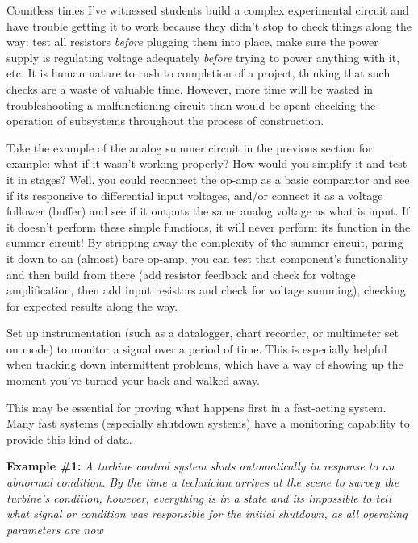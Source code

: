 Countless times I've witnessed students build a complex experimental
circuit and have trouble getting it to work because they didn't stop to
check things along the way: test all resistors {\em before} plugging
them into place, make sure the power supply is regulating voltage
adequately {\em before} trying to power anything with it, etc. It is
human nature to rush to completion of a project, thinking that such
checks are a waste of valuable time. However, more time will be wasted
in troubleshooting a malfunctioning circuit than would be spent checking
the operation of subsystems throughout the process of construction.

Take the example of the analog summer circuit in the previous section
for example: what if it wasn't working properly? How would you simplify
it and test it in stages? Well, you could reconnect the op-amp as a
basic comparator and see if its responsive to differential input
voltages, and/or connect it as a voltage follower (buffer) and see if it
outputs the same analog voltage as what is input. If it doesn't perform
these simple functions, it will never perform its function in the summer
circuit! By stripping away the complexity of the summer circuit, paring
it down to an (almost) bare op-amp, you can test that component's
functionality and then build from there (add resistor feedback and check
for voltage amplification, then add input resistors and check for
voltage summing), checking for expected results along the way.

\stopsubsection

\startsubsection[title={Trap a Signal},reference={sec:xtocid157909712}]

Set up instrumentation (such as a datalogger, chart recorder, or
multimeter set on  mode) to monitor a signal over a
period of time. This is especially helpful when tracking down
intermittent problems, which have a way of showing up the moment you've
turned your back and walked away.

This may be essential for proving what happens first in a fast-acting
system. Many fast systems (especially shutdown  systems)
have a  monitoring capability to provide this kind
of data.

{\bf Example \#1:} {\em A turbine control system shuts automatically in
response to an abnormal condition. By the time a technician arrives at
the scene to survey the turbine's condition, however, everything is in a
 state and its impossible to tell what signal or
condition was responsible for the initial shutdown, as all operating
parameters are now }

